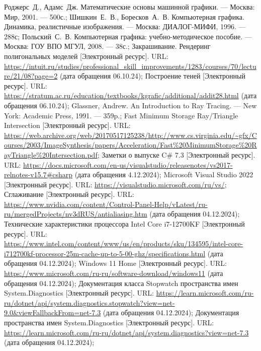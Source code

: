 \begin{thebibliography}{}
	 Роджерс~Д., Адамс~Дж. Математические основы машинной графики. --- Москва: Мир, 2001. --- 500с.;
	 Шишкин~Е.~В., Боресков~А.~В. Компьютерная графика. Динамика, реалистичные изображения. --- Москва: ДИАЛОГ-МИФИ, 1996. --- 288с;
	 Польский~С.~В. Компьютерная графика: учебно-методическое пособие. --- Москва: ГОУ ВПО МГУЛ, 2008. --- 38с.;
	 Закрашивание. Рендеринг полигональных моделей [Электронный ресурс]. URL: \url{https://intuit.ru/studies/professional\_skill\_improvements/1283/courses/70/lecture/21/08?page=2} (дата обращения 06.10.24);
	 Построение теней [Электронный ресурс]. URL: \url{https://stratum.ac.ru/education/textbooks/kgrafic/additional/addit28.html} (дата обращения 06.10.24);
	 Glassner, Andrew. An Introduction to Ray Tracing. --- New York: Academic Press, 1991. --- 359p.;
	 Fast Minimum Storage Ray/Triangle Intersection [Электронный ресурс]. URL: \url{https://web.archive.org/web/20170517125238/http://www.cs.virginia.edu/~gfx/Courses/2003/ImageSynthesis/papers/Acceleration/Fast\%20MinimumStorage\%20RayTriangle\%20Intersection.pdf};
	 Заметки о выпуске C\# 7.3 [Электронный ресурс]. URL: \url{https://docs.microsoft.com/en-us/visualstudio/releasenotes/vs2017-relnotes-v15.7#csharp} (дата обращения 4.12.2024);
	 Microsoft Visual Studio 2022 [Электронный ресурс]. URL: \url{https://visualstudio.microsoft.com/ru/vs/};
	 Сглаживание [Электронный ресурс]. URL: \url{https://www.nvidia.com/content/Control-Panel-Help/vLatest/ru-ru/mergedProjects/nv3dRUS/antialiasing.htm} (дата обращения 04.12.2024);
	 Технические характеристики процессора Intel Core i7-12700KF [Электронный ресурс]. URL: \url{https://www.intel.com/content/www/us/en/products/sku/134595/intel-core-i712700kf-processor-25m-cache-up-to-5-00-ghz/specifications.html} (дата обращения 04.12.2024);
	 Windows 11 Home [Электронный ресурс]. URL: \url{https://www.microsoft.com/ru-ru/software-download/windows11} (дата обращения 04.12.2024);
	 Документация класса Stopwatch пространства имен System.Diagnostics [Электронный ресурс]. URL: \url{https://learn.microsoft.com/ru-ru/dotnet/api/system.diagnostics.stopwatch?view=net-9.0&viewFallbackFrom=net-7.3} (дата обращения 04.12.2024);
	 Документация пространства имен System.Diagnostics [Электронный ресурс]. URL: \url{https://learn.microsoft.com/ru-ru/dotnet/api/system.diagnostics?view=net-7.3} (дата обращения 04.12.2024);
\end{thebibliography}
